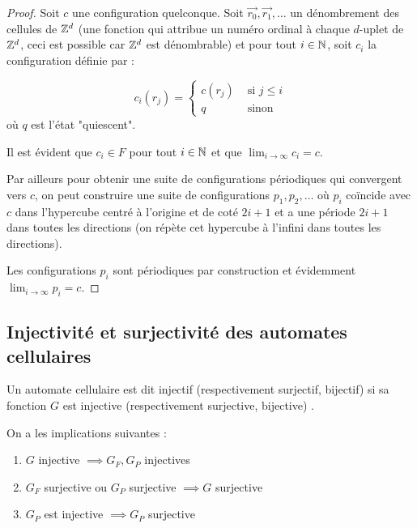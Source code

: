 \begin{proof}
	Soit $c$ une configuration quelconque. Soit $\vec {r_0}, \vec {r_1},\ldots$ un dénombrement des cellules de $\mathbb{Z}^d$ (\cad une fonction qui attribue un numéro ordinal à chaque $d$-uplet de  $\mathbb{Z}^d$, ceci est possible car  $\mathbb{Z}^d$ est dénombrable)  et pour tout $i \in \mathbb{N}$,
	soit $c_i$ la configuration définie par :

	$$ c_i(r_j) = \left\{ \begin{array}{ll}
			c(r_j) & \text{ si } j \leq i \\
			q      & \text{ sinon }
		\end{array}
		\right.$$
	où $q$ est l'état "quiescent".

	Il est évident que $c_i \in F$ pour tout $i \in \mathbb{N}$ et que $\lim_{i \to \infty} c_i = c$.

	Par ailleurs pour obtenir une suite de configurations périodiques qui convergent vers $c$, on peut construire une suite de configurations
	$p_1, p_2, \ldots $ où $p_i$ coïncide avec $c$ dans l'hypercube centré à l'origine et de coté $2i + 1$ et a une
	période $2i + 1$ dans toutes les directions (on répète cet hypercube à l'infini dans toutes les directions).

	Les configurations $p_i$ sont  périodiques  par construction et  évidemment $\lim_{i \to \infty} p_i = c$.
\end{proof}

\subsection{Injectivité et surjectivité des automates cellulaires}

\begin{definition}
	Un automate cellulaire est dit injectif (respectivement surjectif, bijectif)
	si sa fonction $G$ est injective  (respectivement surjective, bijective)
	.
\end{definition}


\begin{theorem} \label{thm:troisprops}
On a les implications suivantes :
	\begin{enumerate}
		\item $G$ injective $\implies G_F, G_P$ injectives \label{thm:big1}
		\item  $G_F$  surjective ou $G_P$  surjective $\implies G$ surjective \label{thm:big2}
		\item  $G_P$ est injective $\implies G_P$ surjective \label{thm:big3}
	\end{enumerate}
\end{theorem}

